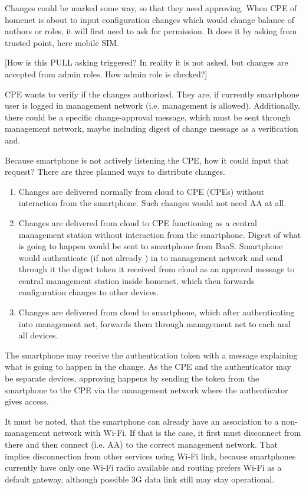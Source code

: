 \documentclass[12pt,a4paper,english]{tutthesis}
\begin{document}
Changes could be marked some way, so that they need approving.
When CPE of homenet is about to input configuration
changes which would change balance of authors or roles,
it will first need to ask for permission. 
It does it by asking from trusted point, here mobile SIM. 

[How is this PULL asking triggered? In reality it is not asked, but
changes are accepted from admin roles. How admin role is checked?]

CPE wants to verify if the changes authorized. They are, if currently
smartphone user is logged in management network (i.e. management is allowed).
Additionally, there could be a  specific change-approval message,
which must be sent through  management network, maybe
including digest of change message as a verification and.

Because smartphone is not actively listening the CPE, how it could
input that request? 
There are three planned ways to distribute changes.

\begin{enumerate}
\item Changes are delivered normally from cloud to CPE (CPEs) without
interaction  from the smartphone. Such changes would not need
AA at all.

\item Changes are delivered from cloud to CPE functioning as a central
management station without interaction from the smartphone. 
Digest of what is going to happen would be sent to smartphone from
BaaS. Smartphone would authenticate (if not already ) in to
management network and send through it the digest token it received from cloud 
as an approval message to central management station
inside homenet, which then forwards configuration changes to other devices.

\item Changes are delivered from cloud to smartphone, which after
authenticating into management net, forwards them through management
net to each and all devices.
\end{enumerate}


The smartphone may receive the authentication token with 
a message explaining what is going to happen in the change.
As the CPE and the authenticator may be separate devices, approving
happens by sending the token from the smartphone to the CPE via the
management network where the authenticator gives access.

It must be noted, that the smartphone can already have an association
to a non-management network with Wi-Fi. If that is the case, it first
must disconnect from there and then connect (i.e. AA) to the correct management
network. That implies disconnection from other services using Wi-Fi
link, because smartphones currently have only one Wi-Fi radio
available and routing prefers Wi-Fi as a default gateway, although
possible 3G data link still may stay operational.
\end{document}
